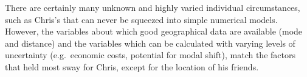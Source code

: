 There are certainly many unknown and highly varied individual circumstances,
such as Chris's that can never be squeezed into simple numerical models.
However, the variables about which good geographical data are available
(mode and distance) and the variables which can be calculated
with varying levels of uncertainty (e.g.~economic costs,
potential for modal shift), match the factors that held most
sway for Chris, except for the location of his friends.

% 
% 

